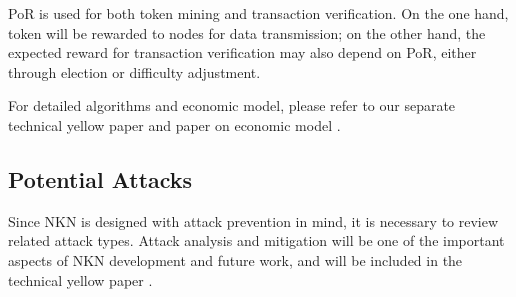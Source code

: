 \documentclass[reprint,pre,aps]{revtex4-1}
\begin{document}
PoR is used for both token mining and transaction verification. On the one hand, token will be rewarded to nodes for data transmission; on the other hand, the expected reward for transaction verification may also depend on PoR, either through election or difficulty adjustment.

For detailed algorithms and economic model, please refer to our separate technical yellow paper \cite{nkn_yellow_paper} and paper on economic model \cite{nkn_economic_model}.

\subsection{Potential Attacks}

Since NKN is designed with attack prevention in mind, it is necessary to review related attack types. Attack analysis and mitigation will be one of the important aspects of NKN development and future work, and will be included in the technical yellow paper \cite{nkn_yellow_paper}.
\end{document}
